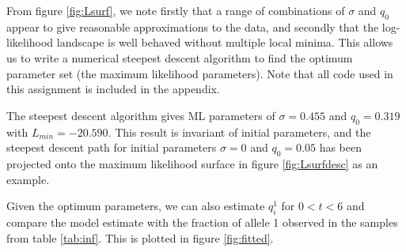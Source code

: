 \documentclass{article}
\begin{document}
From figure \ref{fig:Lsurf}, we note firstly that a range of combinations of $\sigma$ and $q_0$ appear to give reasonable approximations to the data, and secondly that the log-likelihood landscape is well behaved without multiple local minima. This allows us to write a numerical steepest descent algorithm to find the optimum parameter set (the maximum likelihood parameters). Note that all code used in this assignment is included in the appendix.

The steepest descent algorithm gives ML parameters of $\sigma = 0.455$ and $q_0 = 0.319$ with $L_{min} = -20.590$. This result is invariant of initial parameters, and the steepest descent path for initial parameters $\sigma = 0$ and $q_0 = 0.05$ has been projected onto the maximum likelihood surface in figure \ref{fig:Lsurfdesc} as an example.

Given the optimum parameters, we can also estimate $q_i^1$ for $0 < t < 6$ and compare the model estimate with the fraction of allele 1 observed in the samples from table \ref{tab:inf}. This is plotted in figure \ref{fig:fitted}.
\end{document}
